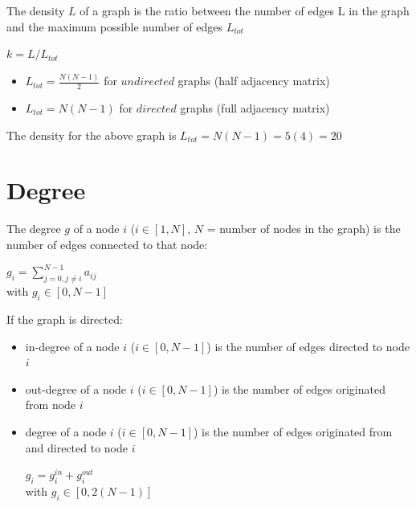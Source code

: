 \documentclass[12pt]{article}
\begin{document}
The density $L$ of a graph is the ratio between the number of edges L in the graph and the maximum possible number of edges $L_{tot}$

\begin{center}
	$k = L/L_{tot}$
\end{center}

\begin{itemize}

	\item $ L_{tot} = \frac{N(N-1)}{2} $ for $undirected$ graphs (half adjacency matrix)
	\item $ L_{tot} = N(N-1) $ for $directed$ graphs (full adjacency matrix)

\end{itemize}

\noindent
The density for the above graph is $L_{tot} = N(N - 1) = 5(4) = 20$

\section{Degree}

The degree $g$ of a node $i$ ($i \in [1, N]$, $N$ = number of nodes in the graph) is the number of edges connected to that node:

\begin{center}
	$g_i = \sum_{j=0, j \neq i}^{N - 1} a_{ij}$ \\
	\vspace{20px}
	with $g_i \in [0, N - 1]$
\end{center}

\noindent
If the graph is directed:

\begin{itemize}
	\item in-degree of a node $i$ ($i \in [0, N - 1]$) is the number of edges directed to node $i$
	\item out-degree of a node $i$ ($i \in [0, N - 1]$) is the number of edges originated from node $i$
	\item degree of a node $i$ ($i \in [0, N - 1]$) is the number of edges originated from and directed to node $i$

	\begin{center}
		$g_i = g_i^{in} + g_i^{out}$ \\
		\vspace{20px}
		with $g_i \in [0, 2(N - 1)]$
	\end{center}
	
\end{itemize}
\end{document}
